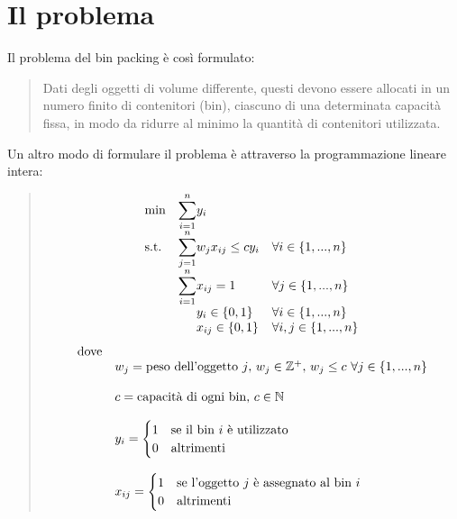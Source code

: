 \section{Il problema}
Il problema del bin packing è così formulato:
\begin{quote}
	Dati degli oggetti di volume differente, questi devono essere allocati in un numero finito di
	contenitori (bin), ciascuno di una determinata capacità fissa, in modo da ridurre al minimo la
	quantità di contenitori utilizzata.
\end{quote}
\noindent
Un altro modo di formulare il problema è attraverso la programmazione lineare intera:
\begin{quote}	
	\begin{equation*}
		\begin{array}{ll@{}ll}
			\text{min}  & \displaystyle\sum\limits_{i=1}^{n} & y_i 					  & \\
			\text{s.t.} & \displaystyle\sum\limits_{j=1}^{n} & w_j x_{ij} \leq c y_i  & \forall i \in \{1, ..., n\}    \\
		                & \displaystyle\sum\limits_{i=1}^{n} & x_{ij} = 1 			  & \forall j \in \{1, ..., n\}    \\
		             	& 								     & y_{i} \in \{0,1\}	  & \forall i \in \{1, ..., n\}    \\
		                & 								     & x_{ij} \in \{0,1\}  	  & \forall i, j \in \{1, ..., n\} \\
		\end{array}
	\end{equation*}
	\begin{equation*}
		\begin{array}{ll@{}ll}
	    	\text{dove} &									& \\
	    				& w_j = \text{peso dell'oggetto } j	\text{, } w_j \in \mathbb{Z}^+ \text{, } w_j \leq c \text{ } \forall j \in \{1, ..., n\}  & \\ \\ 
		    			& c = \text{capacità di ogni bin, } c \in \mathbb{N} & \\ \\
		    			& y_i = 
		    				\begin{cases}
    							1 & \text{se il bin } i \text{ è utilizzato} \\
    							0 & \text{altrimenti}
							\end{cases}					    & \\ \\
						& x_{ij} = 
							\begin{cases}
    							1 & \text{se l'oggetto } j \text{ è assegnato al bin } i \\
    							0 & \text{altrimenti}
							\end{cases}					    & \\
		\end{array}
	\end{equation*}
\end{quote}
